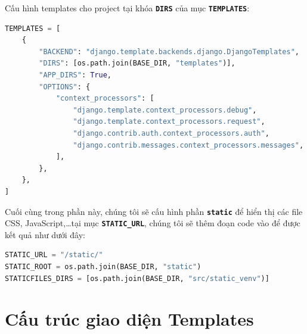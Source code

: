 \par
Cấu hình templates cho project tại khóa \textbf{\texttt{DIRS}} của mục \textbf{\texttt{TEMPLATES}}:
\begin{lstlisting}[language=Python]
TEMPLATES = [
    {
        "BACKEND": "django.template.backends.django.DjangoTemplates",
        "DIRS": [os.path.join(BASE_DIR, "templates")],
        "APP_DIRS": True,
        "OPTIONS": {
            "context_processors": [
                "django.template.context_processors.debug",
                "django.template.context_processors.request",
                "django.contrib.auth.context_processors.auth",
                "django.contrib.messages.context_processors.messages",
            ],
        },
    },
]
\end{lstlisting}
\par
Cuối cùng trong phần này, chúng tôi sẽ cấu hình phần \textbf{\texttt{static}} để hiển thị các file CSS, JavaScript,\ldots tại mục \textbf{\texttt{STATIC\_URL}}, chúng tôi sẽ thêm đoạn code vào để được kết quả như dưới đây:
\begin{lstlisting}[language=Python]
STATIC_URL = "/static/"
STATIC_ROOT = os.path.join(BASE_DIR, "static")
STATICFILES_DIRS = [os.path.join(BASE_DIR, "src/static_venv")]
\end{lstlisting}
\section{Cấu trúc giao diện Templates}
